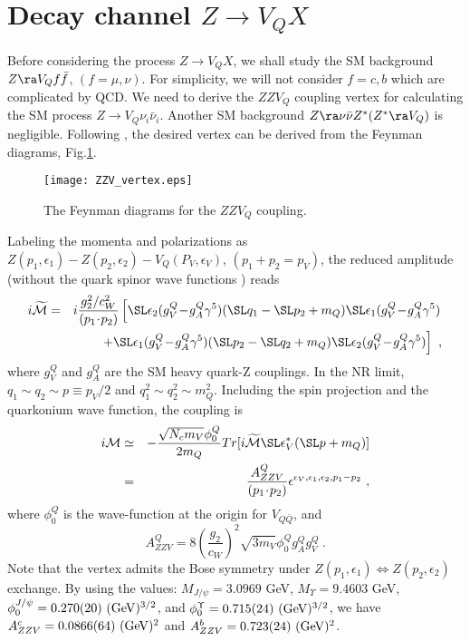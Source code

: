 \documentclass[11pt]{article}
\begin{document}
\section{Decay channel $Z\to V_{Q} X$}\label{sec:quarkoniumdecay}
Before considering the process $Z\to V_Q X$, we shall study the SM background $Z\ra V_Q f\bar{f}$, $(f=\mu,\nu)$.
For simplicity, we will not consider $f=c, b$ which are complicated by QCD.
We need to derive the $ZZV_Q$ coupling vertex for calculating the SM process $Z\to V_Q \nu_i\bar{\nu}_i$.  Another SM background $Z\ra \nu\bar{\nu} Z^*(Z^*\ra V_Q)$ is negligible.
Following \cite{Guberina:1980dc},  the desired vertex can be derived from the Feynman diagrams, Fig.\ref{fig:ZZV_vertex}.
\begin{figure}
    \centering
    \texttt{[image: ZZV\_vertex.eps]}
    \caption{The Feynman diagrams for the $ZZV_Q$ coupling. }
   \label{fig:ZZV_vertex}
\end{figure}
Labeling the momenta and polarizations as $Z(p_1,\epsilon_1)-Z(p_2,\epsilon_2)-V_Q(P_V,\epsilon_V)$, $(p_1+p_2=p_V)$,
the reduced amplitude (without the quark spinor wave functions ) reads
\begin{eqnarray}
i{\cal \widetilde{M}}&=& i\frac{g_2^2/c_W^2}{(p_1\!\cdot\! p_2)}\left[\SL \epsilon_2 (g^Q_V\!-\!g^Q_A\gamma^5)(\SL q_1-\SL p_2+m_Q)\SL \epsilon_1(g^Q_V\!-\!g^Q_A\gamma^5)\right.\nonumber \\
&& \left.+ \SL \epsilon_1 (g^Q_V\!-\!g^Q_A\gamma^5)(\SL p_2-\SL q_2+m_Q)\SL \epsilon_2(g^Q_V\!-\!g^Q_A\gamma^5)\right]\  ,
\end{eqnarray}
where $g^Q_V$ and $g^Q_A$ are the SM heavy quark-Z couplings.
In the NR limit, $q_1\sim q_2 \sim p\equiv p_V/2$ and $q_1^2\sim q_2^2\sim m_Q^2$.
Including the spin projection and the quarkonium wave function, the coupling is
\begin{eqnarray}
i{\cal M}& \simeq &-{\sqrt{N_c m_V}\phi_0^Q\over 2 m_Q} Tr[ i{\cal \widetilde{M}}\SL \epsilon_V^*(\SL p+m_Q)]\\
&=& { A^Q_{ZZV}\over ( p_1\!\cdot\! p_2)} \epsilon^{ \epsilon_V, \epsilon_1, \epsilon_2,  p_1-p_2}\ ,
\end{eqnarray}
where  $\phi_0^Q$ is the wave-function at the origin for $V_{Q\bar{Q}}$, and
\begin{equation}
A^Q_{ZZV}=  8 \left(\frac{g_2}{c_W}\right)^2 \sqrt{3 m_V} \phi_0^Q  g^Q_A g^Q_V\  .
\end{equation}
Note that the vertex admits the Bose symmetry under  $Z(p_1,\epsilon_1)\Leftrightarrow Z(p_2,\epsilon_2)$ exchange.
By using the values\cite{Patrignani:2016xqp,Huang:2014cxa}: $M_{J/\psi}=3.0969$ GeV, $M_\Upsilon=9.4603$ GeV, $\phi_0^{J/\psi}= 0.270(20)\ ({\rm GeV})^{3/2}$, and $\phi_0^\Upsilon= 0.715(24) \ ({\rm GeV})^{3/2}$, we have $A^c_{ZZV}= 0.0866(64) \ ({\rm GeV})^2$ and  $A^b_{ZZV}= 0.723(24) \ ({\rm GeV})^2$.
\end{document}

